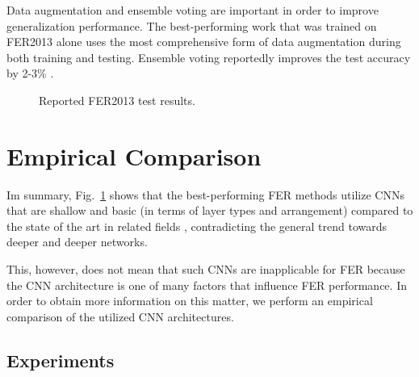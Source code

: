 \documentclass[conference,10pt,a4paper]{IEEEtran}
\begin{document}
Data augmentation and ensemble voting are important in order to improve generalization performance. The best-performing work that was trained on FER2013 alone uses the most comprehensive form of data augmentation during both training and testing. Ensemble voting reportedly improves the test accuracy by 2-3\% \cite{yu15,kim16cvpr}.

\begin{figure}[t]
\begin{center}
\end{center}
\caption{Reported FER2013 test results.}
\label{fig:sota-perf-fer2013}
\end{figure}

\section{Empirical Comparison} \label{sec:empirical_comparison}

Im summary, Fig.~\ref{fig:sota-perf-fer2013} shows that the best-performing FER methods utilize CNNs that are shallow and basic (in terms of layer types and arrangement) compared to the state of the art in related fields \cite{schroff15,he15}, contradicting the general trend towards deeper and deeper networks.

This, however, does not mean that such CNNs are inapplicable for FER because the CNN architecture is one of many factors that influence FER performance. In order to obtain more information on this matter, we perform an empirical comparison of the utilized CNN architectures.

\subsection{Experiments} \label{sub:comparison_experiments}
\end{document}
